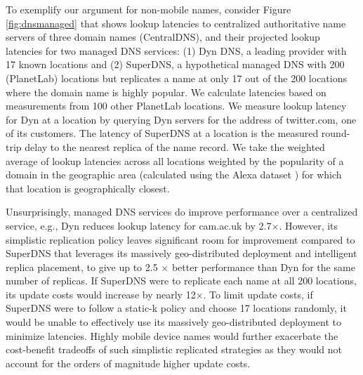 {{{To exemplify our argument for non-mobile names, consider Figure \ref{fig:dnsmanaged} that shows lookup latencies to centralized authoritative name servers of three domain names (CentralDNS), and their projected lookup latencies for two managed DNS services: (1) Dyn DNS, a leading provider with 17 known locations \cite{dnscompare}  and (2)  SuperDNS, a hypothetical managed DNS with 200 (PlanetLab) locations but replicates a name at only 17 out of the 200 locations where the domain name is highly popular. We calculate latencies based on measurements from 100 other PlanetLab locations. We measure lookup latency for Dyn at a location by querying Dyn servers for the address of twitter.com, one of its customers. The latency of SuperDNS at a location is the measured round-trip delay to the nearest replica of the name record.   We take the weighted average of lookup latencies across all locations weighted by the popularity of a domain in the geographic area (calculated using the Alexa dataset  \cite{alexa}) for which that location is geographically closest.

Unsurprisingly, managed DNS services do improve performance over a centralized service, e.g., Dyn reduces lookup latency for cam.ac.uk by 2.7$\times$. However, its simplistic replication policy leaves significant room for improvement compared to SuperDNS that leverages its massively geo-distributed deployment and intelligent replica placement, to give up to 2.5 $\times$ better performance than Dyn for the same number of replicas.
If SuperDNS were to replicate each name at all 200 locations, its update costs would increase by nearly 12$\times$.  To limit update costs, if SuperDNS were to follow a static-k policy and choose 17  locations randomly,  it would be unable to effectively use its massively geo-distributed deployment to minimize latencies.  Highly mobile device names would further exacerbate the cost-benefit tradeoffs of such simplistic replicated strategies as they would not account for the orders of magnitude higher update costs.
}}

}


